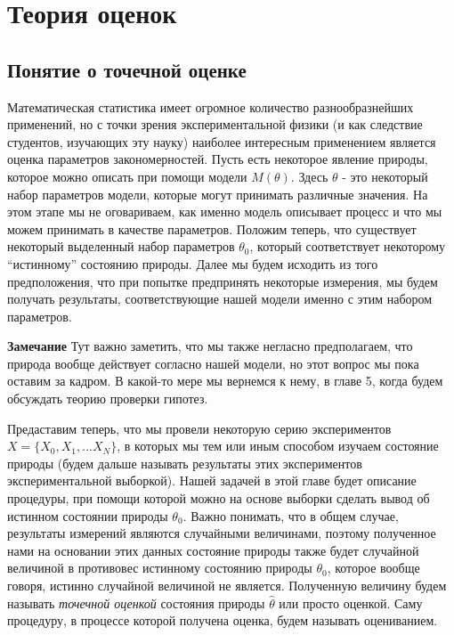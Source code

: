 \chapter{Теория оценок}


\section{Понятие о точечной оценке}

    Математическая статистика имеет огромное количество разнообразнейших
применений, но с точки зрения экспериментальной физики (и как следствие
студентов, изучающих эту науку) наиболее интересным применением является
оценка параметров закономерностей. Пусть есть некоторое явление природы,
которое можно описать при помощи модели $M(\theta)$. Здесь $\theta$
- это некоторый набор параметров модели, которые могут принимать
различные значения. На этом этапе мы не оговариваем, как именно модель
описывает процесс и что мы можем принимать в качестве параметров.
Положим теперь, что существует некоторый выделенный набор параметров
$\theta_0$, который соответствует некоторому ``истинному'' состоянию
природы. Далее мы будем исходить из того предположения, что при попытке
предпринять некоторые измерения, мы будем получать результаты,
соответствующие нашей модели именно с этим набором параметров.

\textbf{Замечание} Тут важно заметить, что мы также негласно
предполагаем, что природа вообще действует согласно нашей модели, но
этот вопрос мы пока оставим за кадром. В какой-то мере мы вернемся к
нему, в главе 5, когда будем обсуждать теорию проверки гипотез.

Предаставим теперь, что мы провели некоторую серию экспериментов
$X = \{X_0, X_1,...X_N\}$, в которых мы тем или иным способом изучаем
состояние природы (будем дальше называть результаты этих экспериментов
экспериментальной выборкой). Нашей задачей в этой главе будет описание
процедуры, при помощи которой можно на основе выборки сделать вывод об
истинном состоянии природы $\theta_0$. Важно понимать, что в общем
случае, результаты измерений являются случайными величинами, поэтому
полученное нами на основании этих данных состояние природы также будет
случайной величиной в противовес истинному состоянию природы
$\theta_0$, которое вообще говоря, истинно случайной величиной не
является. Полученную величину будем называть \emph{точечной оценкой}
состояния природы $\hat{\theta}$ или просто оценкой. Саму процедуру, в
процессе которой получена оценка, будем называть оцениванием.

